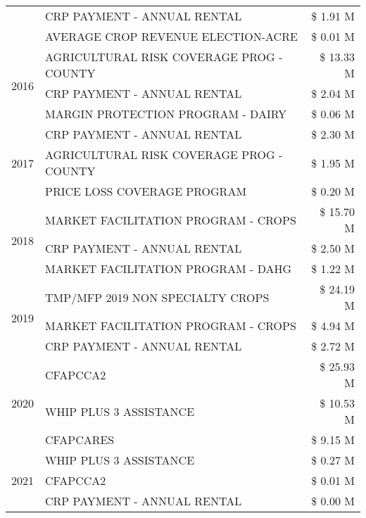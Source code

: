 \begin{tabular}{llr}
 & CRP PAYMENT - ANNUAL RENTAL & \$ 1.91 M \\
 & AVERAGE CROP REVENUE ELECTION-ACRE & \$ 0.01 M \\
\cline{1-3}
\multirow[t]{3}{*}{2016} & AGRICULTURAL RISK COVERAGE PROG - COUNTY & \$ 13.33 M \\
 & CRP PAYMENT - ANNUAL RENTAL & \$ 2.04 M \\
 & MARGIN PROTECTION PROGRAM - DAIRY & \$ 0.06 M \\
\cline{1-3}
\multirow[t]{3}{*}{2017} & CRP PAYMENT - ANNUAL RENTAL & \$ 2.30 M \\
 & AGRICULTURAL RISK COVERAGE PROG - COUNTY & \$ 1.95 M \\
 & PRICE LOSS COVERAGE PROGRAM & \$ 0.20 M \\
\cline{1-3}
\multirow[t]{3}{*}{2018} & MARKET FACILITATION PROGRAM - CROPS & \$ 15.70 M \\
 & CRP PAYMENT - ANNUAL RENTAL & \$ 2.50 M \\
 & MARKET FACILITATION PROGRAM - DAHG & \$ 1.22 M \\
\cline{1-3}
\multirow[t]{3}{*}{2019} & TMP/MFP 2019 NON SPECIALTY CROPS & \$ 24.19 M \\
 & MARKET FACILITATION PROGRAM - CROPS & \$ 4.94 M \\
 & CRP PAYMENT - ANNUAL RENTAL & \$ 2.72 M \\
\cline{1-3}
\multirow[t]{3}{*}{2020} & CFAPCCA2 & \$ 25.93 M \\
 & WHIP PLUS 3 ASSISTANCE & \$ 10.53 M \\
 & CFAPCARES & \$ 9.15 M \\
\cline{1-3}
\multirow[t]{3}{*}{2021} & WHIP PLUS 3 ASSISTANCE & \$ 0.27 M \\
 & CFAPCCA2 & \$ 0.01 M \\
 & CRP PAYMENT - ANNUAL RENTAL & \$ 0.00 M \\
\cline{1-3}
\bottomrule
\end{tabular}
